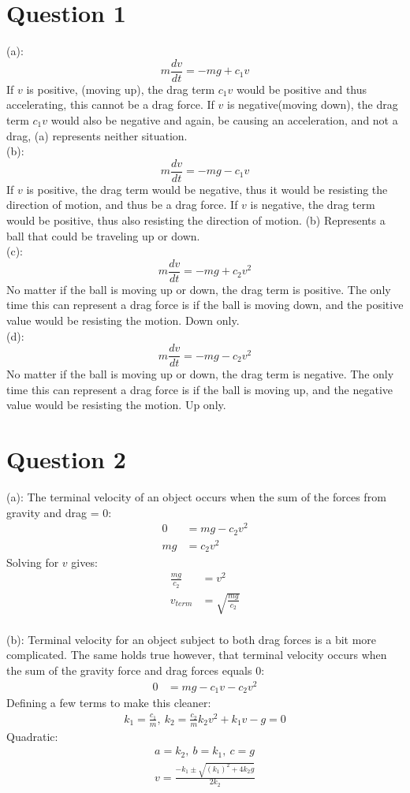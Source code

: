 \documentclass[a4paper,12pt]{article}
\begin{document}
\section*{Question 1}


(a): \[m\frac{dv}{dt}=-mg+c_1v\] 
If $v$ is positive, (moving up), the drag term $c_1v$ would be positive and thus accelerating, this cannot be a drag force.  If $v$ is negative(moving down), the drag term $c_1v$ would also be negative and again, be causing an acceleration, and not a drag, (a) represents neither situation.
\\
(b):\[m\frac{dv}{dt}=-mg-c_1v\]
If $v$ is positive, the drag term would be negative, thus it would be resisting the direction of motion, and thus be a drag force.  If $v$ is negative, the drag term would be positive, thus also resisting the direction of motion. (b) Represents a ball that could be traveling up or down.
\\
(c):\[m\frac{dv}{dt}=-mg+c_2v^2\] 
No matter if the ball is moving up or down, the drag term is positive.  The only time this can represent a drag force is if the ball is moving down, and the positive value would be resisting the motion.  Down only.
\\
(d):\[m\frac{dv}{dt}=-mg-c_2v^2\]
No matter if the ball is moving up or down, the drag term is negative.  The only time this can represent a drag force is if the ball is moving up, and the negative value would be resisting the motion. Up only.
\newpage
\section*{Question 2}
(a): The terminal velocity of an object occurs when the sum of the forces from gravity and drag = 0:
\begin{align*}
0&=mg-c_2v^2\\
mg&=c_2v^2
\end{align*}
Solving for $v$ gives:
\begin{align*}
\frac{mg}{c_2}&=v^2\\
v_{term}&=\sqrt{\frac{mg}{c_2}}
\end{align*}
\\
(b): Terminal velocity for an object subject to both drag forces is a bit more complicated.  The same holds true however, that terminal velocity occurs when the sum of the gravity force and drag forces equals 0:
\begin{align*}
0&=mg-c_1v-c_2v^2
\end{align*}
Defining a few terms to make this cleaner:
\begin{align*}
k_1=\frac{c_1}{m},\ k_2=\frac{c_2}{m}
k_2v^2+k_1v-g=0
\end{align*}
Quadratic:
\begin{align*}
a=k_2,\ b=k_1,\ c=g\\
v=\frac{-k_1\pm\sqrt{(k_1)^2+4k_2g}}{2k_2}
\end{align*}
\end{document}
